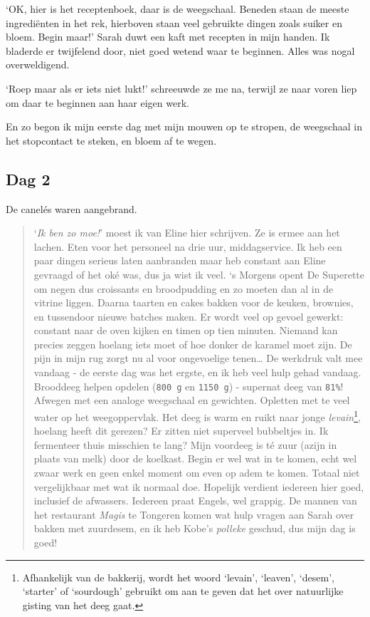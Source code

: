 \documentclass[
  11pt,
  dutch,
]{memoir}
\begin{document}
`OK, hier is het receptenboek, daar is de weegschaal. Beneden staan de
meeste ingrediënten in het rek, hierboven staan veel gebruikte dingen
zoals suiker en bloem. Begin maar!' Sarah duwt een kaft met recepten in
mijn handen. Ik bladerde er twijfelend door, niet goed wetend waar te
beginnen. Alles was nogal overweldigend.

`Roep maar als er iets niet lukt!' schreeuwde ze me na, terwijl ze naar
voren liep om daar te beginnen aan haar eigen werk.

En zo begon ik mijn eerste dag met mijn mouwen op te stropen, de
weegschaal in het stopcontact te steken, en bloem af te wegen.

\hypertarget{dag-2-1}{%
\subsection{Dag 2}\label{dag-2-1}}

De canelés waren aangebrand.

\begin{quote}
`\emph{Ik ben zo moe!}' moest ik van Eline hier schrijven. Ze is ermee
aan het lachen. Eten voor het personeel na drie uur, middagservice. Ik
heb een paar dingen serieus laten aanbranden maar heb constant aan Eline
gevraagd of het oké was, dus ja wist ik veel. `s Morgens opent De
Superette om negen dus croissants en broodpudding en zo moeten dan al in
de vitrine liggen. Daarna taarten en cakes bakken voor de keuken,
brownies, en tussendoor nieuwe batches maken. Er wordt veel op gevoel
gewerkt: constant naar de oven kijken en timen op tien minuten. Niemand
kan precies zeggen hoelang iets moet of hoe donker de karamel moet zijn.
De pijn in mijn rug zorgt nu al voor ongevoelige tenen\ldots{} De
werkdruk valt mee vandaag - de eerste dag was het ergste, en ik heb veel
hulp gehad vandaag. Brooddeeg helpen opdelen (\texttt{800\ g} en
\texttt{1150\ g}) - supernat deeg van \texttt{81\%}! Afwegen met een
analoge weegschaal en gewichten. Opletten met te veel water op het
weegoppervlak. Het deeg is warm en ruikt naar jonge
\emph{levain}\footnote{Afhankelijk van de bakkerij, wordt het woord
  `levain', `leaven', `desem', `starter' of `sourdough' gebruikt om aan
  te geven dat het over natuurlijke gisting van het deeg gaat.}, hoelang
heeft dit gerezen? Er zitten niet superveel bubbeltjes in. Ik fermenteer
thuis misschien te lang? Mijn voordeeg is té zuur (azijn in plaats van
melk) door de koelkast. Begin er wel wat in te komen, echt wel zwaar
werk en geen enkel moment om even op adem te komen. Totaal niet
vergelijkbaar met wat ik normaal doe. Hopelijk verdient iedereen hier
goed, inclusief de afwassers. Iedereen praat Engels, wel grappig. De
mannen van het restaurant \emph{Magis} te Tongeren komen wat hulp vragen
aan Sarah over bakken met zuurdesem, en ik heb Kobe's \emph{polleke}
geschud, dus mijn dag is goed!
\end{quote}
\end{document}
